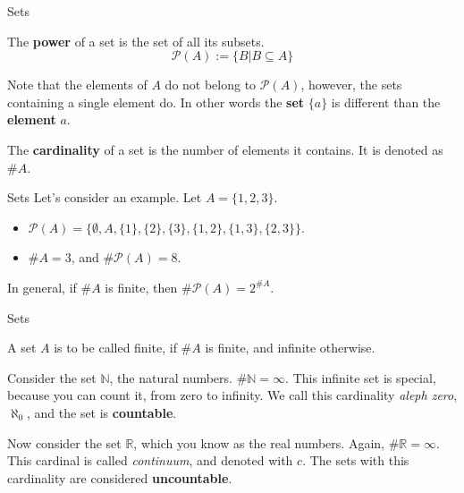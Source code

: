 \documentclass[aspectratio=169]{beamer}
\begin{document}
\begin{frame}{Sets}
    \begin{definition}
        The \textbf{power} of a set is the set of all its subsets.
        $$\mathcal{P}(A):=\{B|B\subseteq A\}$$
    \end{definition}
    
    Note that the elements of $A$ do not belong to $\mathcal{P}(A)$, however, the sets containing a single element do. In other words the \textbf{set} $\{a\}$ is different than the \textbf{element} $a$.

    \begin{definition}
        The \textbf{cardinality} of a set is the number of elements it contains. It is denoted as $\#A$.
    \end{definition}

\end{frame}

\begin{frame}{Sets}
    Let's consider an example. Let $A=\{1,2,3\}$.
    
    \begin{itemize}
        \item $\mathcal{P}(A)=\{\emptyset, A,\{1\},\{2\},\{3\},\{1,2\},\{1,3\},\{2,3\}\}$.
        \item $\#A=3$, and $\#\mathcal{P}(A)=8$. 
    \end{itemize}
    
    In general, if $\#A$ is finite, then $\#\mathcal{P}(A)=2^{\#A}$.
\end{frame}

\begin{frame}{Sets}
    \begin{definition}
        A set $A$ is to be called finite, if $\#A$ is finite, and infinite otherwise.
    \end{definition}
    
    \vspace{0.5cm}
    
    Consider the set $\mathbb{N}$, the natural numbers. $\#\mathbb{N}=\infty$. This infinite set is special, because you can count it, from zero to infinity. We call this cardinality \emph{aleph zero}, $\aleph_0$, and the set is \textbf{countable}.
    
    \vspace{0.5cm}
    
    Now consider the set $\mathbb{R}$, which you know as the real numbers. Again, $\#\mathbb{R}=\infty$. This cardinal is called \emph{continuum}, and denoted with $c$. The sets with this cardinality are considered \textbf{uncountable}.
\end{frame}
\end{document}
